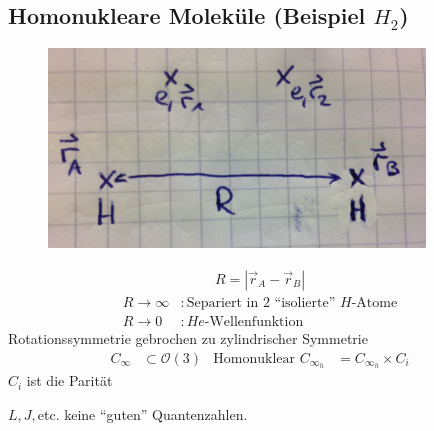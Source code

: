 \subsection{Homonukleare Moleküle (Beispiel $H_2$)}
	\begin{figure} [h]
		\begin{center}
			\includegraphics[width=10cm]{Homonukleare_Molekuele1}
		\end{center}
	\end{figure}
	\begin{align*}
		R = | \vec{r}_A - \vec{r}_B |
	\end{align*}
	\begin{align*}
		R \rightarrow \infty &: \text{Separiert in 2 ``isolierte'' }H \text{-Atome} \\
		R \rightarrow 0 &: He\text{-Wellenfunktion}
	\end{align*}
Rotationssymmetrie gebrochen zu zylindrischer Symmetrie
	\begin{align*}
		C_\infty &\subset \mathscr{O} (3) 
		&\text{Homonuklear } C_{\infty_h} &= C_{\infty_h} \times C_i
	\end{align*}
$C_i$ ist die Parität

$L, J,$etc. keine ``guten'' Quantenzahlen.

